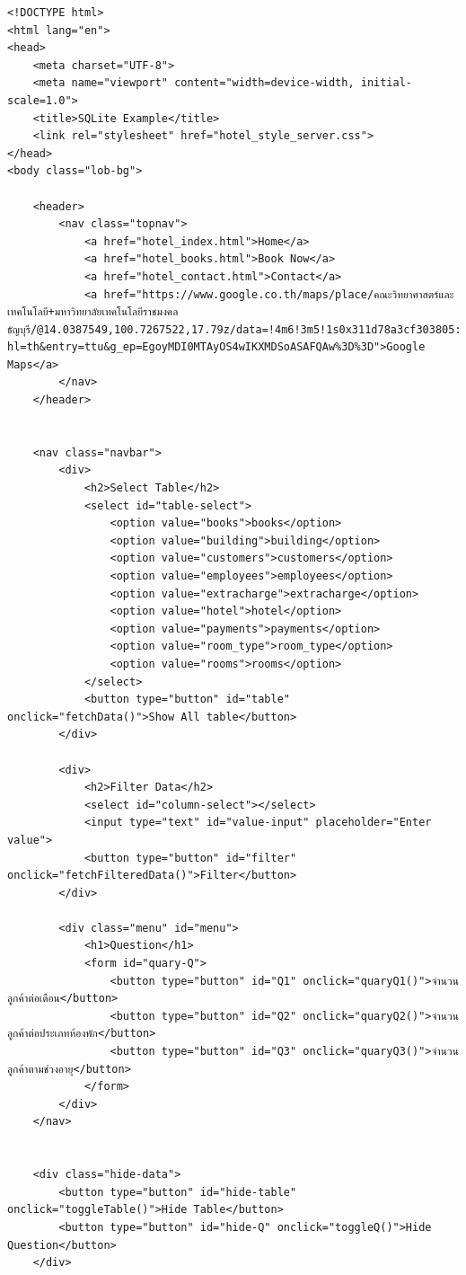 \documentclass{report}
\begin{document}
\begin{verbatim}
<!DOCTYPE html>
<html lang="en">
<head>
    <meta charset="UTF-8">
    <meta name="viewport" content="width=device-width, initial-scale=1.0">
    <title>SQLite Example</title>
    <link rel="stylesheet" href="hotel_style_server.css">
</head>
<body class="lob-bg">

    <header>
        <nav class="topnav">
            <a href="hotel_index.html">Home</a>
            <a href="hotel_books.html">Book Now</a>
            <a href="hotel_contact.html">Contact</a>
            <a href="https://www.google.co.th/maps/place/คณะวิทยาศาสตร์และเทคโนโลยี+มหาวิทยาลัยเทคโนโลยีราชมงคลธัญบุรี/@14.0387549,100.7267522,17.79z/data=!4m6!3m5!1s0x311d78a3cf303805:0x298cef6207b64026!8m2!3d14.0395596!4d100.7289406!16s%2Fg%2F12nvpzlcn?hl=th&entry=ttu&g_ep=EgoyMDI0MTAyOS4wIKXMDSoASAFQAw%3D%3D">Google Maps</a>
        </nav>
    </header>


    <nav class="navbar">
        <div>
            <h2>Select Table</h2>
            <select id="table-select">
                <option value="books">books</option>
                <option value="building">building</option>
                <option value="customers">customers</option>
                <option value="employees">employees</option>
                <option value="extracharge">extracharge</option>
                <option value="hotel">hotel</option>
                <option value="payments">payments</option>
                <option value="room_type">room_type</option>
                <option value="rooms">rooms</option>
            </select>
            <button type="button" id="table" onclick="fetchData()">Show All table</button>
        </div>
    
        <div>
            <h2>Filter Data</h2>
            <select id="column-select"></select>
            <input type="text" id="value-input" placeholder="Enter value">
            <button type="button" id="filter" onclick="fetchFilteredData()">Filter</button>
        </div>
    
        <div class="menu" id="menu">
            <h1>Question</h1>
            <form id="quary-Q">
                <button type="button" id="Q1" onclick="quaryQ1()">จำนวนลูกค้าต่อเดือน</button>
                <button type="button" id="Q2" onclick="quaryQ2()">จำนวนลูกค้าต่อประเภทห้องพัก</button>
                <button type="button" id="Q3" onclick="quaryQ3()">จำนวนลูกค้าตามช่วงอายุ</button>
            </form>
        </div>
    </nav>


    <div class="hide-data">
        <button type="button" id="hide-table" onclick="toggleTable()">Hide Table</button>
        <button type="button" id="hide-Q" onclick="toggleQ()">Hide Question</button>
    </div>


\end{verbatim}
\end{document}
